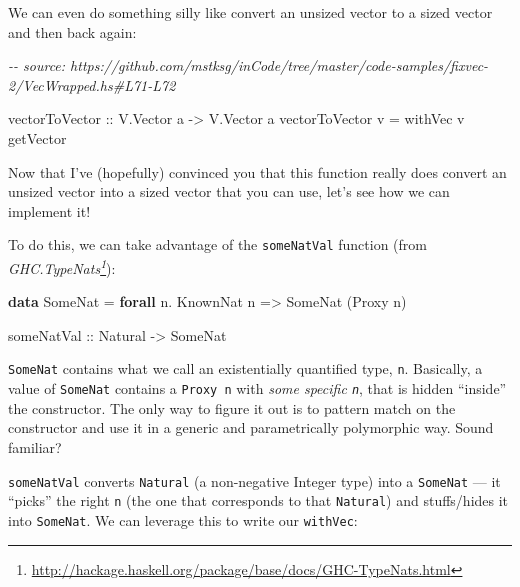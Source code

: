 \documentclass[]{article}
\newenvironment{Shaded}{}{}
\newcommand{\CommentTok}[1]{\textcolor[rgb]{0.38,0.63,0.69}{\textit{#1}}}
\newcommand{\DataTypeTok}[1]{\textcolor[rgb]{0.56,0.13,0.00}{#1}}
\newcommand{\KeywordTok}[1]{\textcolor[rgb]{0.00,0.44,0.13}{\textbf{#1}}}
\newcommand{\NormalTok}[1]{#1}
\newcommand{\OperatorTok}[1]{\textcolor[rgb]{0.40,0.40,0.40}{#1}}
\newcommand{\OtherTok}[1]{\textcolor[rgb]{0.00,0.44,0.13}{#1}}
\renewcommand{\href}[2]{#2\footnote{\url{#1}}}
\begin{document}
We can even do something silly like convert an unsized vector to a sized vector
and then back again:

\begin{Shaded}
\begin{Highlighting}[]
\CommentTok{{-}{-} source: https://github.com/mstksg/inCode/tree/master/code{-}samples/fixvec{-}2/VecWrapped.hs\#L71{-}L72}

\OtherTok{vectorToVector ::} \DataTypeTok{V.Vector}\NormalTok{ a }\OtherTok{{-}>} \DataTypeTok{V.Vector}\NormalTok{ a}
\NormalTok{vectorToVector v }\OtherTok{=}\NormalTok{ withVec v getVector}
\end{Highlighting}
\end{Shaded}

Now that I've (hopefully) convinced you that this function really does convert
an unsized vector into a sized vector that you can use, let's see how we can
implement it!

To do this, we can take advantage of the \texttt{someNatVal} function (from
\emph{\href{http://hackage.haskell.org/package/base/docs/GHC-TypeNats.html}{GHC.TypeNats}}):

\begin{Shaded}
\begin{Highlighting}[]
\KeywordTok{data} \DataTypeTok{SomeNat} \OtherTok{=} \KeywordTok{forall}\NormalTok{ n}\OperatorTok{.} \DataTypeTok{KnownNat}\NormalTok{ n }\OtherTok{=>} \DataTypeTok{SomeNat}\NormalTok{ (}\DataTypeTok{Proxy}\NormalTok{ n)}

\OtherTok{someNatVal ::} \DataTypeTok{Natural} \OtherTok{{-}>} \DataTypeTok{SomeNat}
\end{Highlighting}
\end{Shaded}

\texttt{SomeNat} contains what we call an existentially quantified type,
\texttt{n}. Basically, a value of \texttt{SomeNat} contains a \texttt{Proxy\ n}
with \emph{some specific \texttt{n}}, that is hidden ``inside'' the constructor.
The only way to figure it out is to pattern match on the constructor and use it
in a generic and parametrically polymorphic way. Sound familiar?

\texttt{someNatVal} converts \texttt{Natural} (a non-negative Integer type) into
a \texttt{SomeNat} --- it ``picks'' the right \texttt{n} (the one that
corresponds to that \texttt{Natural}) and stuffs/hides it into \texttt{SomeNat}.
We can leverage this to write our \texttt{withVec}:
\end{document}
